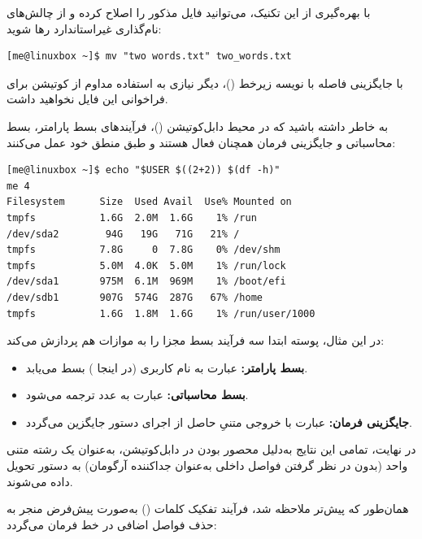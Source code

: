 با بهره‌گیری از این تکنیک، می‌توانید فایل مذکور را اصلاح کرده و از چالش‌های نام‌گذاری غیراستاندارد رها شوید:

\begin{latin}
\begin{lstlisting}
[me@linuxbox ~]$ mv "two words.txt" two_words.txt
\end{lstlisting}
\end{latin}

با جایگزینی فاصله با نویسه زیرخط (\cmd{\_})، دیگر نیازی به استفاده مداوم از کوتیشن برای فراخوانی این فایل نخواهید داشت.

به خاطر داشته باشید که در محیط دابل‌کوتیشن ()، فرآیندهای بسط پارامتر، بسط محاسباتی و جایگزینی فرمان همچنان فعال هستند و طبق منطق خود عمل می‌کنند:

\begin{latin}
\begin{lstlisting}
[me@linuxbox ~]$ echo "$USER $((2+2)) $(df -h)"
me 4
Filesystem      Size  Used Avail  Use% Mounted on
tmpfs           1.6G  2.0M  1.6G    1% /run
/dev/sda2        94G   19G   71G   21% /
tmpfs           7.8G     0  7.8G    0% /dev/shm
tmpfs           5.0M  4.0K  5.0M    1% /run/lock
/dev/sda1       975M  6.1M  969M    1% /boot/efi
/dev/sdb1       907G  574G  287G   67% /home
tmpfs           1.6G  1.8M  1.6G    1% /run/user/1000
\end{lstlisting}
\end{latin}

در این مثال، پوسته ابتدا سه فرآیند بسط مجزا را به موازات هم پردازش می‌کند:

\begin{itemize}
  \item \textbf{بسط پارامتر:} عبارت  به نام کاربری (در اینجا ) بسط می‌یابد.
  \item \textbf{بسط محاسباتی:} عبارت  به عدد  ترجمه می‌شود.
  \item \textbf{جایگزینی فرمان:} عبارت  با خروجی متنیِ حاصل از اجرای دستور  جایگزین می‌گردد.
\end{itemize}

در نهایت، تمامی این نتایج به‌دلیل محصور بودن در دابل‌کوتیشن، به‌عنوان یک رشته متنی واحد (بدون در نظر گرفتن فواصل داخلی به‌عنوان جداکننده آرگومان) به دستور  تحویل داده می‌شوند.

همان‌طور که پیش‌تر ملاحظه شد، فرآیند تفکیک کلمات () به‌صورت پیش‌فرض منجر به حذف فواصل اضافی در خط فرمان می‌گردد:

